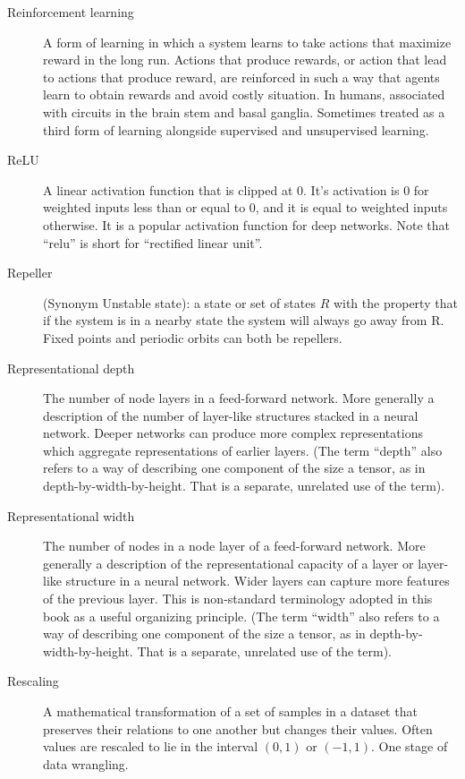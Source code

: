 \begin{description}
\item[Reinforcement learning] A form of learning in which a system learns to take actions that maximize reward in the long run.   Actions that produce rewards, or action that lead to actions that produce reward, are reinforced in such a way that agents learn to obtain rewards and avoid costly situation.  In humans, associated with circuits in the brain stem and basal ganglia.  Sometimes treated as a third form of learning alongside supervised and unsupervised learning.

\item[ReLU] A linear activation function that is clipped at  0. It's activation is 0 for weighted inputs less than or equal to 0, and it is equal to weighted inputs otherwise. It is a popular activation function for deep networks. Note that ``relu'' is short for ``rectified linear unit''.

\item[Repeller] (Synonym Unstable state): a state or set of states $R$ with the property that if the system is in a nearby state the system will always go away from R. Fixed points and periodic orbits can both be repellers.

\item[Representational depth] The number of node layers in a feed-forward network. More generally a description of the number of  layer-like structures stacked in a neural network. Deeper networks can produce more complex representations which aggregate representations of earlier layers. (The term ``depth'' also refers to a way of describing one component of the size a tensor, as in depth-by-width-by-height. That is a separate, unrelated use of the term).
 
\item[Representational width] The number of nodes in a node layer of a feed-forward network. More generally a description of the representational capacity of a layer or layer-like structure in a neural network. Wider layers can capture more features of the previous layer. This is non-standard terminology adopted in this book as a useful organizing principle. (The term ``width'' also refers to a way of describing one component of the size a tensor, as in depth-by-width-by-height. That is a separate, unrelated use of the term).

\item[Rescaling] A mathematical transformation of a set of samples in a dataset that preserves their relations to one another but changes their values. Often values are rescaled to lie in the interval $(0,1)$ or $(-1,1)$. One stage of data wrangling.


\end{description}

